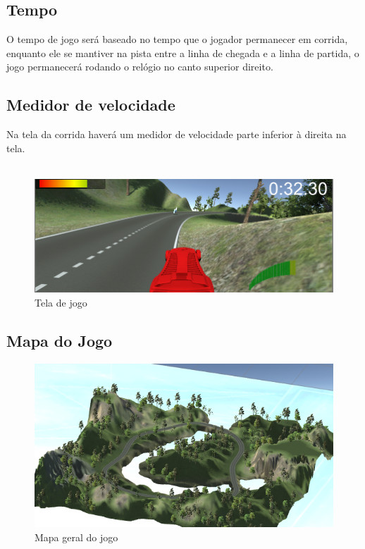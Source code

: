    \subsection{Tempo}

        O tempo de jogo será baseado no tempo que o jogador permanecer em corrida, enquanto ele se mantiver na pista entre a linha de chegada e a linha de partida, o jogo permanecerá rodando o relógio no canto superior direito.

    \subsection{Medidor de velocidade}

        Na tela da corrida haverá um medidor de velocidade parte inferior à direita na tela. \\\
        
\begin{figure}[!h]
		\centering
	\includegraphics[scale=0.5]{figuras/hud}
		\caption{Tela de jogo}
\end{figure}

	\subsection{Mapa do Jogo}
	
\begin{figure}[!h]
		\centering
	\includegraphics[scale=0.5]{figuras/mapa}
		\caption{Mapa geral do jogo}
\end{figure}	